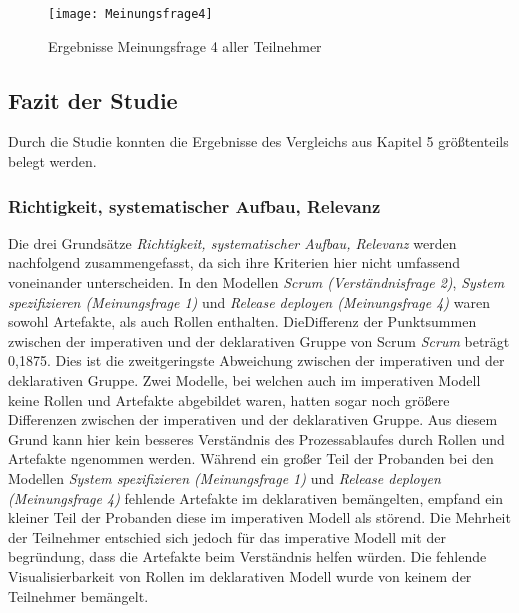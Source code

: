 \begin{figure}[htp]
\begin{center}
  \texttt{[image: Meinungsfrage4]} %
  \caption{Ergebnisse Meinungsfrage 4 aller Teilnehmer}
  \label{fig:Meinungsfrage4}
\end{center}
\end{figure}

\clearpage

\subsection{Fazit der Studie}

Durch die Studie konnten die Ergebnisse des Vergleichs aus Kapitel 5 größtenteils belegt werden.\newline

\subsubsection{Richtigkeit, systematischer Aufbau, Relevanz}


Die drei Grundsätze \textit{Richtigkeit, systematischer Aufbau, Relevanz} werden nachfolgend zusammengefasst, da sich ihre Kriterien hier nicht umfassend voneinander unterscheiden.\newline
In den Modellen \textit{Scrum (Verständnisfrage 2)}, \textit{System spezifizieren (Meinungsfrage 1)} und \textit{Release deployen (Meinungsfrage 4)} waren sowohl Artefakte, als auch Rollen enthalten. DieDifferenz der Punktsummen zwischen der imperativen und der deklarativen Gruppe von Scrum \textit{Scrum} beträgt 0,1875. Dies ist die zweitgeringste Abweichung zwischen der imperativen und der deklarativen Gruppe. Zwei Modelle, bei welchen auch im imperativen Modell keine Rollen und Artefakte abgebildet waren, hatten sogar noch größere Differenzen zwischen der imperativen und der deklarativen Gruppe. Aus diesem Grund kann hier kein besseres Verständnis des Prozessablaufes durch Rollen und Artefakte ngenommen werden. \newline
Während ein großer Teil der Probanden bei den Modellen \textit{System spezifizieren (Meinungsfrage 1)} und \textit{Release deployen (Meinungsfrage 4)} fehlende Artefakte im deklarativen bemängelten, empfand ein kleiner Teil der Probanden diese im imperativen Modell als störend. Die Mehrheit der Teilnehmer entschied sich jedoch für das imperative Modell mit der begründung, dass die Artefakte beim Verständnis helfen würden. Die fehlende Visualisierbarkeit von Rollen im deklarativen Modell wurde von keinem der Teilnehmer bemängelt.\newline



